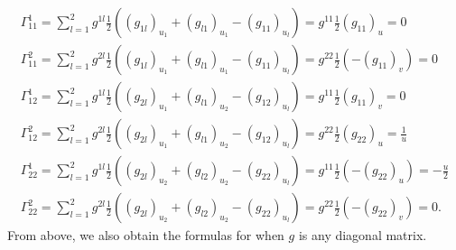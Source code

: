 \documentclass[a4paper,12pt]{article}
\theoremstyle{remark}
\begin{document}
\begin{enumerate}
        \begin{gather*}
            \Gamma_{11}^1 = \sum_{l = 1}^2 g^{1l} \frac{1}{2} \left( (g_{1l})_{u_1} + (g_{l1})_{u_1} - (g_{11})_{u_l} \right) = g^{11} \frac{1}{2} (g_{11})_u = 0 \\
            \Gamma_{11}^2 = \sum_{l = 1}^2 g^{2l} \frac{1}{2} \left( (g_{1l})_{u_1} + (g_{l1})_{u_1} - (g_{11})_{u_l} \right) = g^{22} \frac{1}{2} \left( -(g_{11})_v \right) = 0 \\
            \Gamma_{12}^1 = \sum_{l = 1}^2 g^{1l} \frac{1}{2} \left( (g_{2l})_{u_1} + (g_{l1})_{u_2} - (g_{12})_{u_l} \right) = g^{11} \frac{1}{2} (g_{11})_v = 0 \\
            \Gamma_{12}^2 = \sum_{l = 1}^2 g^{2l} \frac{1}{2} \left( (g_{2l})_{u_1} + (g_{l1})_{u_2} - (g_{12})_{u_l} \right) = g^{22} \frac{1}{2} (g_{22})_u = \frac{1}{u} \\
            \Gamma_{22}^1 = \sum_{l = 1}^2 g^{1l} \frac{1}{2} \left( (g_{2l})_{u_2} + (g_{l2})_{u_2} - (g_{22})_{u_l} \right) = g^{11} \frac{1}{2} \left( -(g_{22})_u \right) = -\frac{u}{2} \\
            \Gamma_{22}^2 = \sum_{l = 1}^2 g^{2l} \frac{1}{2} \left( (g_{2l})_{u_2} + (g_{l2})_{u_2} - (g_{22})_{u_l} \right) = g^{22} \frac{1}{2} \left( -(g_{22})_v \right) = 0.
        \end{gather*}
        From above, we also obtain the formulas for when $g$ is any diagonal matrix.


\end{enumerate}
\end{document}
